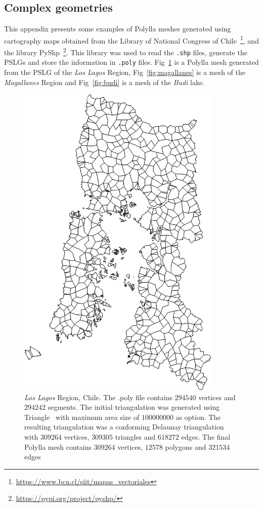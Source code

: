 \documentclass[lineno,pdflatex,sn-mathphys]{sn-jnl}%
\theoremstyle{thmstyleone}%
\theoremstyle{thmstyletwo}%
\theoremstyle{thmstylethree}%
\begin{document}
\begin{appendices}

\section{Complex geometries}\label{Appendix:complexgeometries}

This appendix presents some examples of Polylla meshes generated using cartography maps obtained from the Library of National Congress of Chile~\footnote{\url{https://www.bcn.cl/siit/mapas_vectoriales}}, and the library PyShp~\footnote{\url{https://pypi.org/project/pyshp/}}. This library was used to read the \texttt{.shp} files, generate the PSLGs and store the information in \texttt{.poly} files. Fig~\ref{fig:loslagos} is a Polylla mesh generated from the PSLG of the {\em Los Lagos} Region, Fig~\ref{fig:magallanes} is a mesh of the {\em Magallanes} Region and Fig~\ref{fig:budi} is a mesh of the {\em Budi} lake.

\begin{figure}[]
    \centering
    \includegraphics[width=0.87\textwidth]{llagos.png}
    \caption{{\em Los Lagos} Region, Chile. The  .poly file contains $294540$ vertices and $294242$ segments. The initial triangulation was generated using Triangle~\cite{triangle2d} with maximum area size of $100000000$ as option.  The resulting triangulation was a conforming Delaunay triangulation with  $309264$ vertices, $309305$ triangles and $618272$ edges. The final Polylla mesh contains $309264$ vertices, $12578$ polygons and $321534$ edges}
    \label{fig:loslagos}
\end{figure}


\end{appendices}
\end{document}
